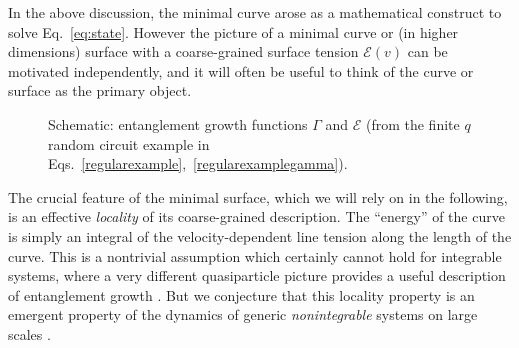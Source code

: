 \documentclass[aps,prx,twocolumn,superscriptaddress,floatfix,nofootinbib,prx]{revtex4}
\renewcommand{\>}{\right\rangle}
\newcommand{\<}{\left\langle}
\newcommand{\lt}{\mathcal{E}}
\begin{document}
In the above discussion, the minimal curve arose as a mathematical construct to solve Eq.~\ref{eq:state}. However the picture of a minimal curve or (in higher dimensions) surface with a coarse-grained surface tension $\lt(v)$ can be motivated independently, and it will often be useful to think of the curve or surface as the primary object.


\begin{figure}[t]
\caption{
Schematic: entanglement growth functions $\Gamma$ and $\lt$ (from the finite $q$ random circuit example in Eqs.~\ref{regularexample},~\ref{regularexamplegamma}).
}  \label{egammafig}
\end{figure}


The crucial feature of the minimal surface, which we will rely on in the following,  is an effective \textit{locality} of its coarse-grained description. The ``energy'' of the curve is simply an integral of the velocity-dependent line tension along the length of the curve.  This is a nontrivial assumption which certainly cannot hold for integrable systems, where a very different quasiparticle picture provides a useful description of entanglement growth \cite{CCreview}.  But  we conjecture  that this locality property is an emergent property of the dynamics of generic \textit{nonintegrable} systems on large scales \cite{nahum}.
\end{document}
